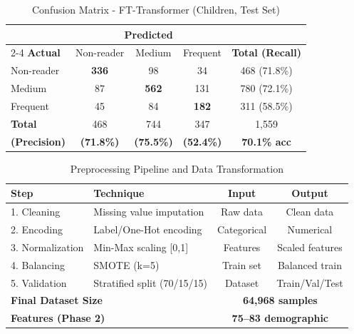 \documentclass{article}
\begin{document}

\begin{table}[ht]
\centering
\caption{Confusion Matrix - FT-Transformer (Children, Test Set)}
\label{tab:confusion_matrix}
\begin{tabular}{lcccc}
\toprule
& \multicolumn{3}{c}{\textbf{Predicted}} & \\
\cmidrule(lr){2-4}
\textbf{Actual} & Non-reader & Medium & Frequent & \textbf{Total (Recall)} \\
\midrule
Non-reader  & \textbf{336} & 98  & 34  & 468 (71.8\%) \\
Medium      & 87  & \textbf{562} & 131 & 780 (72.1\%) \\
Frequent    & 45  & 84  & \textbf{182} & 311 (58.5\%) \\
\midrule
\textbf{Total} & 468 & 744 & 347 & 1,559 \\
\textbf{(Precision)} & \textbf{(71.8\%)} & \textbf{(75.5\%)} & \textbf{(52.4\%)} & \textbf{70.1\% acc} \\
\bottomrule
\end{tabular}
\end{table}


\begin{table}[ht]
\centering
\caption{Preprocessing Pipeline and Data Transformation}
\label{tab:preprocessing}
\begin{tabular}{llcc}
\toprule
\textbf{Step} & \textbf{Technique} & \textbf{Input} & \textbf{Output} \\
\midrule
1. Cleaning        & Missing value imputation & Raw data     & Clean data \\
2. Encoding        & Label/One-Hot encoding   & Categorical  & Numerical \\
3. Normalization   & Min-Max scaling [0,1]    & Features     & Scaled features \\
4. Balancing       & SMOTE (k=5)              & Train set    & Balanced train \\
5. Validation      & Stratified split (70/15/15) & Dataset   & Train/Val/Test \\
\midrule
\multicolumn{2}{l}{\textbf{Final Dataset Size}} & \multicolumn{2}{c}{\textbf{64,968 samples}} \\
\multicolumn{2}{l}{\textbf{Features (Phase 2)}} & \multicolumn{2}{c}{\textbf{75--83 demographic}} \\
\bottomrule
\end{tabular}
\end{table}
\end{document}

